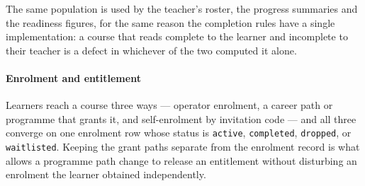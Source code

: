 The same population is used by the teacher's roster, the progress summaries and the readiness figures, for the same reason the completion rules have a single implementation: a course that reads complete to the learner and incomplete to their teacher is a defect in whichever of the two computed it alone.

\paragraph{Enrolment and entitlement}
Learners reach a course three ways --- operator enrolment, a career path or programme that grants it, and self-enrolment by invitation code --- and all three converge on one enrolment row whose status is \texttt{active}, \texttt{completed}, \texttt{dropped}, or \texttt{waitlisted}. Keeping the grant paths separate from the enrolment record is what allows a programme path change to release an entitlement without disturbing an enrolment the learner obtained independently.
